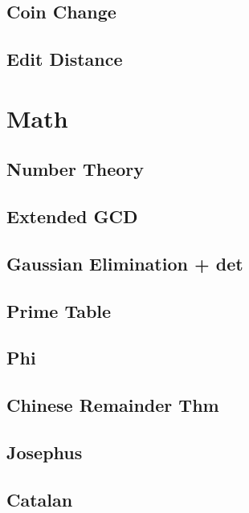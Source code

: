    \subsection{Coin Change}
        
    \subsection{Edit Distance}
        

\section{Math}
    \subsection{Number Theory}
        
    \subsection{Extended GCD}
        
    \subsection{Gaussian Elimination + det}
        
    \subsection{Prime Table}
        
    \subsection{Phi}
        
    \subsection{Chinese Remainder Thm}
        
    \subsection{Josephus}
        
    \subsection{Catalan}
        
